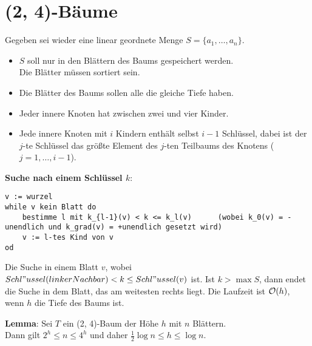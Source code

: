 \section{%
    (2, 4)-Bäume
}

Gegeben sei wieder eine linear geordnete Menge $S = \{a_1, \dotsc, a_n\}$.
\begin{itemize}
    \item
    $S$ soll nur in den Blättern des Baums gespeichert werden. \\
    Die Blätter müssen sortiert sein.

    \item
    Die Blätter des Baums sollen alle die gleiche Tiefe haben.

    \item
    Jeder innere Knoten hat zwischen zwei und vier Kinder.

    \item
    Jede innere Knoten mit $i$ Kindern enthält selbst $i - 1$ Schlüssel,
    dabei ist der $j$-te Schlüssel das größte Element des $j$-ten Teilbaums
    des Knotens ($j = 1, \dotsc, i - 1$).
\end{itemize}

\linie

\textbf{Suche nach einem Schlüssel $k$}:
\begin{lstlisting}
v := wurzel
while v kein Blatt do
    bestimme l mit k_{l-1}(v) < k <= k_l(v)      (wobei k_0(v) = -unendlich und k_grad(v) = +unendlich gesetzt wird)
    v := l-tes Kind von v
od
\end{lstlisting}

Die Suche in einem Blatt $v$, wobei
$Schl"ussel(linkerNachbar) < k \le Schl"ussel(v)$ ist.
Ist $k > \max S$, dann endet die Suche in dem Blatt, das am weitesten rechts
liegt.
Die Laufzeit ist $\mathcal{O}(h)$, wenn $h$ die Tiefe des Baums ist.

\pagebreak

\textbf{Lemma}: Sei $T$ ein (2, 4)-Baum der Höhe $h$ mit $n$ Blättern. \\
Dann gilt $2^h \le n \le 4^h$ und daher $\frac{1}{2} \log n \le h \le \log n$.

\linie

